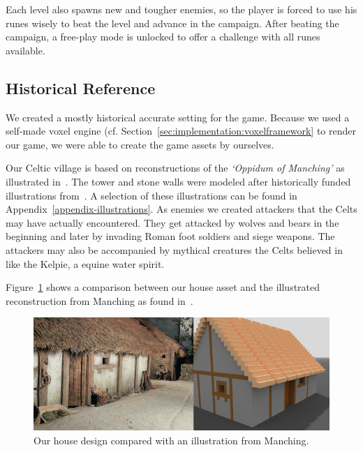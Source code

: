 Each level also spawns new and tougher enemies, so the player is forced to use his runes wisely to beat the level and advance in the campaign.
After beating the campaign, a free-play mode is unlocked to offer a challenge with all runes available.


\subsection{Historical Reference}
\label{sec:game_design:subsec:history}

We created a mostly historical accurate setting for the game. Because we used a self-made voxel engine (cf. Section~\ref{sec:implementation:voxelframework} to render our game, we were able to create the game assets by ourselves.

Our Celtic village is based on reconstructions of the \textit{`Oppidum of Manching'} as illustrated in~\cite{kraemer-oppidum-maching}. The tower and stone walls were modeled after historically funded illustrations from~\cite{kraemer-oppidum-maching}\cite{rieckhoff-walls1}\cite{rieckhoff-walls2}\cite{rieckhoff-tower}. A selection of these illustrations can be found in Appendix~\ref{appendix-illustrations}. As enemies we created attackers that the Celts may have actually encountered.
They get attacked by wolves and bears in the beginning and later by invading Roman foot soldiers and siege weapons.
The attackers may also be accompanied by mythical creatures the Celts believed in like the Kelpie, a equine water spirit.

Figure~\ref{fig:house-comparison} shows a comparison between our house asset and the illustrated reconstruction from Manching as found in~\cite{kraemer-oppidum-maching}.

\begin{figure}[ht]
	\centering
	\includegraphics[width=\linewidth]{figures/house_comparison.png}
	\caption{Our house design compared with an illustration from Manching.}
	\label{fig:house-comparison}
\end{figure}







